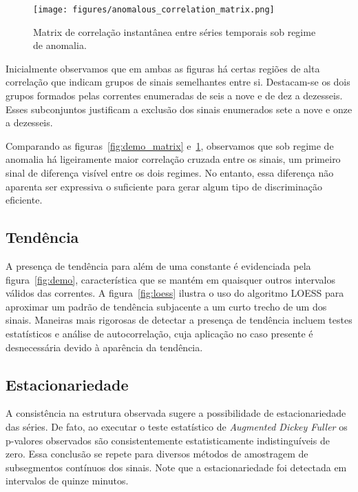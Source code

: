 \begin{figure}[H]
    \centering
    \texttt{[image: figures/anomalous\_correlation\_matrix.png]}
    \caption{Matrix de correlação instantânea entre séries temporais sob
    regime de anomalia.}
    \label{fig:demo_matrix_anomaly}
\end{figure}

Inicialmente observamos que em ambas as figuras há certas regiões de alta
correlação que indicam grupos de sinais semelhantes entre si. Destacam-se os
dois grupos formados pelas correntes enumeradas de seis a nove e de dez a
dezesseis. Esses subconjuntos justificam a exclusão dos sinais enumerados sete
a nove e onze a dezesseis.

Comparando as figuras~\ref{fig:demo_matrix} e~\ref{fig:demo_matrix_anomaly},
observamos que sob regime de anomalia há ligeiramente maior correlação cruzada
entre os sinais, um primeiro sinal de diferença visível entre os dois regimes.
No entanto, essa diferença não aparenta ser expressiva o suficiente para gerar
algum tipo de discriminação eficiente.

\subsection{Tendência}

A presença de tendência para além de uma constante é evidenciada pela
figura~\ref{fig:demo}, característica que se mantém em quaisquer outros
intervalos válidos das correntes. A figura~\ref{fig:loess} ilustra o uso do
algoritmo LOESS para aproximar um padrão de tendência subjacente a um curto
trecho de um dos sinais. Maneiras mais rigorosas de detectar a presença de
tendência incluem testes estatísticos e análise de autocorrelação, cuja
aplicação no caso presente é desnecessária devido à aparência da tendência.

\subsection{Estacionariedade}

A consistência na estrutura observada sugere a possibilidade de
estacionariedade das séries. De fato, ao executar o teste estatístico de
\emph{Augmented Dickey Fuller} os p-valores observados são consistentemente
estatisticamente indistinguíveis de zero. Essa conclusão se repete para
diversos métodos de amostragem de subsegmentos contínuos dos sinais. Note
que a estacionariedade foi detectada em intervalos de quinze minutos.

